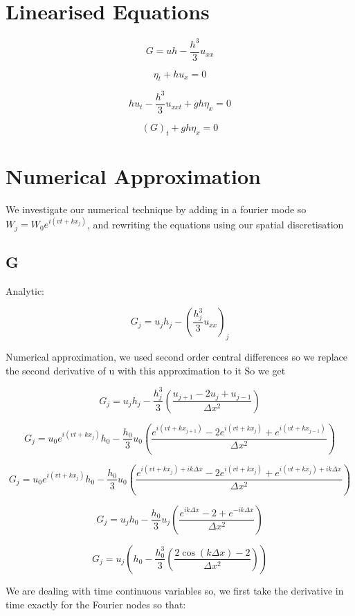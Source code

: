 \documentclass[12pt]{article}
\begin{document}
\section{Linearised Equations}



\[G = uh  -  \frac{h^3}{3} u_{xx}\]

\[\eta_t + h u_x = 0\]

\[h u_t - \frac{h^3}{3} u_{xxt}  + gh \eta_x  = 0\]

\[ \left(G\right)_t  + gh \eta_x  = 0\]

\section{Numerical Approximation}

We investigate our numerical technique by adding in a fourier mode so $W_j = W_0 e^{ i\left(vt + kx_j\right)}$, and rewriting the equations using our spatial discretisation

\subsection{G}

Analytic:

\[G_j = u_jh _j  -  (\frac{h_j^3}{3} {u_{xx}})_j\]

Numerical approximation, we used second order central differences so we replace the second derivative of u with this approximation to it
So we get

\[G_j = u_jh _j  -  \frac{h_j^3}{3} \left(\dfrac{u_{j+1} - 2 u_{j} + u_{j-1}}{\Delta x^2}\right)\]

\[G_j = u_0 e^{ i\left(vt + kx_j\right)} h_0 -  \frac{h_0}{3} u_0 \left(\dfrac{e^{ i\left(vt + kx_{j+ 1}\right)} - 2e^{ i\left(vt + kx_j\right)} +e^{ i\left(vt + kx_{j-1}\right)}}{\Delta x^2}\right)\]

\[G_j = u_0 e^{ i\left(vt + kx_j\right)} h_0 -  \frac{h_0}{3} u_0 \left(\dfrac{e^{ i\left(vt + kx_{j}\right) + ik\Delta x} - 2e^{ i\left(vt + kx_j\right)} +e^{ i\left(vt + kx_{j}\right) + ik\Delta x}}{\Delta x^2}\right)\]


\[G_j = u_j h_0 -  \frac{h_0}{3} u_j \left(\dfrac{e^{ ik\Delta x} - 2 +e^{ -ik\Delta x}}{\Delta x^2}\right)\]


\[G_j = u_j \left( h_0 -  \frac{h_0^3}{3} \left(\dfrac{2\cos\left(k{\Delta x}\right) - 2}{\Delta x^2}\right) \right)\]


We are dealing with time continuous  variables so, we first take the derivative in time exactly for the Fourier nodes so that:
\end{document}
